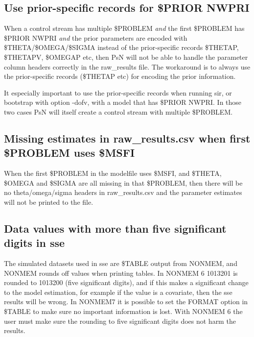 \subsection{Use prior-specific records for \$PRIOR NWPRI}
When a control stream has multiple \$PROBLEM \emph{and} the first \$PROBLEM has \$PRIOR NWPRI
\emph{and} the prior parameters are encoded with \$THETA/\$OMEGA/\$SIGMA instead of the
prior-specific records \$THETAP, \$THETAPV, \$OMEGAP etc, then PsN will not be able to handle the parameter column
headers correctly in the raw\_results file. The workaround is to always use the prior-specific records 
(\$THETAP etc) for encoding the prior information.

It especially important to use the prior-specific records when running sir,  
or bootstrap with option -dofv,
with a model that has \$PRIOR NWPRI. In
those two cases PsN will itself create a control stream with multiple \$PROBLEM.

\subsection{Missing estimates in raw\_results.csv when first \$PROBLEM uses \$MSFI}
When the first \$PROBLEM in the modelfile uses \$MSFI, and \$THETA, \$OMEGA and \$SIGMA are all missing in that \$PROBLEM, then there will be no theta/omega/sigma headers in raw\_results.csv and the parameter estimates will not be printed to the file.

\subsection{Data values with more than five significant digits in sse}
The simulated datasets used in sse are \$TABLE output from NONMEM, and NONMEM rounds off values when printing tables. In NONMEM 6 1013201 is rounded to 1013200 (five significant digits), and if this makes a significant change to the model estimation, for example if the value is a covariate, then the sse results will be wrong. In NONMEM7 it is possible to set the FORMAT option in \$TABLE to make sure no important information is lost. With NONMEM 6 the user must make sure the rounding to five significant digits does not harm the results.


